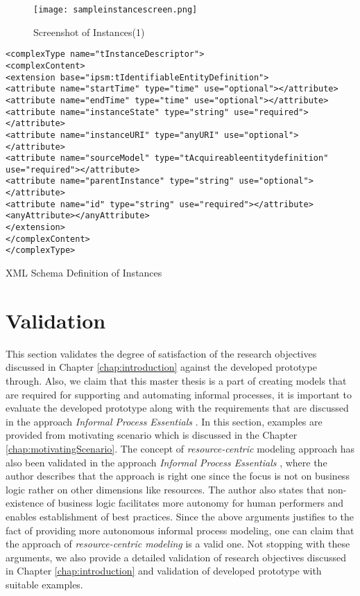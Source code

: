 \begin{figure}
	\centering
	\texttt{[image: sampleinstancescreen.png]}
	\caption{Screenshot of Instances(1)}
	\label{fig:realizationofinstances}
\end{figure}


\begin{Listing}
	\begin{lstlisting}
<complexType name="tInstanceDescriptor">
<complexContent>
<extension base="ipsm:tIdentifiableEntityDefinition">
<attribute name="startTime" type="time" use="optional"></attribute>
<attribute name="endTime" type="time" use="optional"></attribute>
<attribute name="instanceState" type="string" use="required"></attribute>
<attribute name="instanceURI" type="anyURI" use="optional"></attribute>
<attribute name="sourceModel" type="tAcquireableentitydefinition" use="required"></attribute>
<attribute name="parentInstance" type="string" use="optional"></attribute>
<attribute name="id" type="string" use="required"></attribute>
<anyAttribute></anyAttribute>
</extension>
</complexContent>
</complexType>		
\end{lstlisting}
\caption{XML Schema Definition of Instances}
\label{lst:xsdinstances}
\end{Listing}
		
\section{Validation}
\label{sec:validation}
This section validates the degree of satisfaction of the research objectives discussed in Chapter \ref{chap:introduction} against the developed prototype through. Also, we claim that this master thesis is a part of creating models that are required for supporting and automating informal processes, it is important to evaluate the developed prototype along with the requirements that are discussed in the approach \textit{Informal Process Essentials} \cite{Sungur2014a}. In this section, examples are provided from motivating scenario which is discussed in the Chapter \ref{chap:motivatingScenario}. The concept of \textit{resource-centric} modeling approach has also been validated in the approach \textit{Informal Process Essentials} \cite{Sungur2014a}, where the author describes that the approach is right one since the focus is not on business logic rather on other dimensions like resources. The author also states that non-existence of business logic facilitates more autonomy for human performers and enables establishment of best practices. Since the above arguments justifies to the fact of providing more autonomous informal process modeling, one can claim that the approach of \textit{resource-centric modeling} is a valid one. Not stopping with these arguments, we also provide a detailed validation of research objectives discussed in Chapter \ref{chap:introduction} and validation of developed prototype with suitable examples.
		

